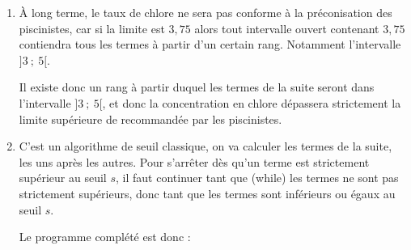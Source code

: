 \begin{enumerate}
\begin{enumerate}
		\item De la question précédente, on retient :
		\begin{itemize}
			\item $\forall n \in \N,\quad v_n \leqslant v_{n+1}$\quad donc la suite $\left(v_n\right)$ est croissante;
			\item $\forall n \in \N,\quad v_n \leqslant 4$ \quad donc la suite $\left(v_n\right)$ est majorée par 4.
		\end{itemize}
D'après le théorème de croissance monotone la suite $\left(v_n\right)$ est donc convergente, vers une limite $\ell$ inférieure ou égale à 4.

		De plus, la suite $\left(v_n\right)$ est définie par récurrence, et la fonction de récurrence : \quad $x\longmapsto 0,92x + 0,3$ \quad est continue sur $\R$, puisque c'est une fonction affine, donc la suite ne peut converger que vers un point fixe de la fonction de récurrence

$\ell$ est donc une solution de l'équation :\quad $\begin{aligned}[t] x = 0,92x + 0,3 &\iff 0,08x = 0,3\\&\iff x = \dfrac{0,3}{0,08}\\&\iff x = 3,75\end{aligned}$

L'équation n'a qu'une solution, donc la suite $\left(v_n\right)$ converge vers $3,75$.
	\end{enumerate}
\item À long terme, le taux de chlore ne sera pas conforme à la préconisation des piscinistes, car si la limite est $3,75$  alors tout intervalle ouvert contenant $3,75$  contiendra tous les termes à partir d'un certain rang. Notamment l'intervalle $]3~;~5[$.

Il existe donc un rang à partir duquel les termes de la suite seront dans l'intervalle $]3~;~5[$, et donc la concentration en chlore dépassera strictement la limite supérieure de  recommandée par les piscinistes.

	\item C'est un algorithme de seuil classique, on va calculer les termes de la suite, les uns après les autres. Pour s'arrêter dès qu'un terme est strictement supérieur au seuil $s$, il faut continuer tant que (while) les termes ne sont pas strictement supérieurs, donc tant que les termes sont inférieurs ou égaux au seuil $s$.

Le programme complété est donc :


\end{enumerate}
